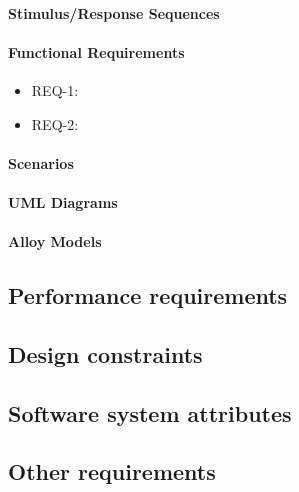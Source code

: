 \paragraph{Stimulus/Response Sequences}
\paragraph{Functional Requirements}
\begin{itemize}
	\item REQ-1:  
	\item REQ-2:
\end{itemize}
\paragraph{Scenarios}
\paragraph{UML Diagrams}
\paragraph{Alloy Models}
\subsection{Performance requirements}
\subsection{Design constraints}
\subsection{Software system attributes}
\subsection{Other requirements}
